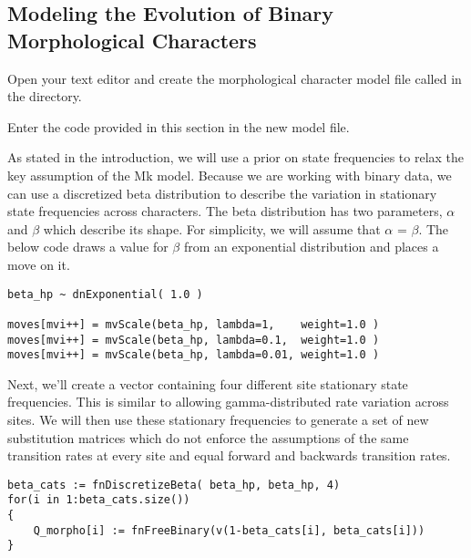 \bigskip

\subsection{Modeling the Evolution of Binary Morphological Characters}\label{subsect:Exercise-ModelMorph}

{\begin{framed}
Open your text editor and create the morphological character model file called {\textcolor{red}{}} in the  directory.

Enter the \Rev code provided in this section in the new model file.
\end{framed}}

As stated in the introduction, we will use a prior on state frequencies to relax the key assumption of the Mk model. 
Because we are working with binary data, we can use a discretized beta distribution to describe the variation in stationary state frequencies across characters. 
The beta distribution has two parameters, $\alpha$ and $\beta$ which describe its shape. 
For simplicity, we will assume that $\alpha$ = $\beta$. 
The below code draws a value for $\beta$ from an exponential distribution and places a move on it.

{\tt \begin{snugshade*}
\begin{lstlisting}
beta_hp ~ dnExponential( 1.0 )

moves[mvi++] = mvScale(beta_hp, lambda=1,    weight=1.0 )
moves[mvi++] = mvScale(beta_hp, lambda=0.1,  weight=1.0 )
moves[mvi++] = mvScale(beta_hp, lambda=0.01, weight=1.0 )
\end{lstlisting}
\end{snugshade*}}

Next, we'll create a vector containing four different site stationary state frequencies. 
This is similar to allowing gamma-distributed rate variation across sites. 
We will then use these stationary frequencies to generate a set of new substitution matrices which do not enforce the assumptions of the same transition rates at every site and equal forward and backwards transition rates.

{\tt \begin{snugshade*}
\begin{lstlisting}
beta_cats := fnDiscretizeBeta( beta_hp, beta_hp, 4)
for(i in 1:beta_cats.size())
{
    Q_morpho[i] := fnFreeBinary(v(1-beta_cats[i], beta_cats[i]))
}
\end{lstlisting}
\end{snugshade*}}


